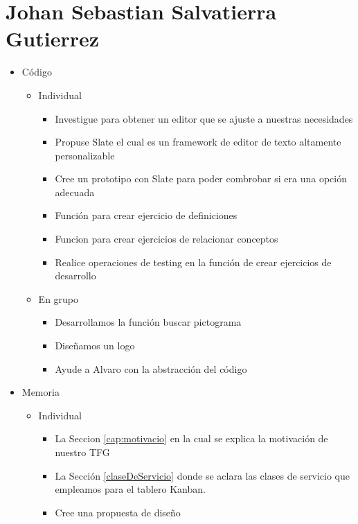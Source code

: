 \section{Johan Sebastian Salvatierra Gutierrez}
\begin{itemize}
    \item Código
        \begin{itemize}
            \item Individual
                \begin{itemize}
                    \item Investigue para obtener un editor que se ajuste a nuestras necesidades
                    \item Propuse Slate el cual es un framework de editor de texto altamente personalizable 
                    \item Cree un prototipo con Slate para poder combrobar si era una opción adecuada
                    \item Función para crear ejercicio de definiciones
                    \item Funcion para crear ejercicios de relacionar conceptos
                    \item Realice operaciones de testing en la función de crear ejercicios de desarrollo
                \end{itemize}
            \item En grupo
                \begin{itemize}
                    \item Desarrollamos la función buscar pictograma
                    \item Diseñamos un logo
                    \item Ayude a Alvaro con la abstracción del código
                \end{itemize}
        \end{itemize}
    \item Memoria
    \begin{itemize}
        \item Individual
            \begin{itemize}
                \item La Seccion \ref{cap:motivacio} en la cual se explica la motivación de nuestro TFG
                \item La Sección \ref{claseDeServicio} donde se aclara las clases de servicio que empleamos para el tablero Kanban.
                \item Cree una propuesta de diseño

\end{itemize}
\end{itemize}
\end{itemize}
